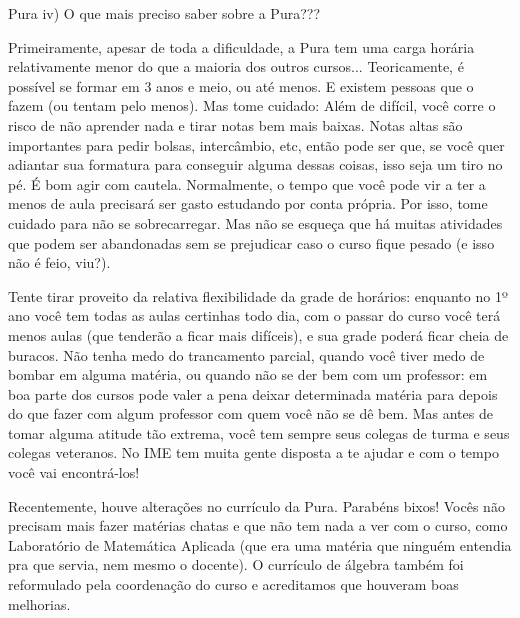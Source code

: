 \begin{subsecao}{Pura}
iv) O que mais preciso saber sobre a Pura???

Primeiramente, apesar de toda a dificuldade, a Pura tem uma carga horária
relativamente menor do que a maioria dos outros cursos... Teoricamente, é
possível se formar em 3 anos e meio, ou até menos. E existem pessoas que o
fazem (ou tentam pelo menos). Mas tome cuidado: Além de difícil, você
corre o risco de não aprender nada e tirar notas bem mais baixas. Notas altas
são importantes para pedir bolsas, intercâmbio, etc, então pode ser que, se você
quer adiantar sua formatura para conseguir alguma dessas coisas, isso seja um
tiro no pé. É bom agir com cautela. Normalmente, o tempo que você pode vir a ter
a menos de aula precisará ser gasto estudando por conta própria. Por isso, tome
cuidado para não se sobrecarregar. Mas não se esqueça que há muitas atividades
que podem ser abandonadas sem se prejudicar caso o curso fique pesado (e isso não é feio, viu?).

Tente tirar proveito da relativa flexibilidade da grade de horários: enquanto
no 1º ano você tem todas as aulas certinhas todo dia, com o passar do
curso você terá menos aulas (que tenderão a ficar mais difíceis), e sua
grade poderá ficar cheia de buracos. Não tenha medo do trancamento parcial,
quando você tiver medo de bombar em alguma matéria, ou quando não se der bem com
um professor: em boa parte dos cursos pode valer a pena deixar determinada
matéria para depois do que fazer com algum professor com quem você não se dê
bem. Mas antes de tomar alguma atitude tão extrema, você tem sempre seus colegas
de turma e seus colegas veteranos. No IME tem muita gente disposta a te ajudar e
com o tempo você vai encontrá-los!




Recentemente, houve alterações no currículo da Pura. Parabéns bixos! Vocês não
precisam mais fazer matérias chatas e que não tem nada a ver com o curso, como
Laboratório de Matemática Aplicada (que era uma matéria que ninguém entendia 
pra que servia, nem mesmo o docente). O currículo de álgebra também foi 
reformulado pela coordenação do curso e acreditamos que houveram boas melhorias.


\end{subsecao}
